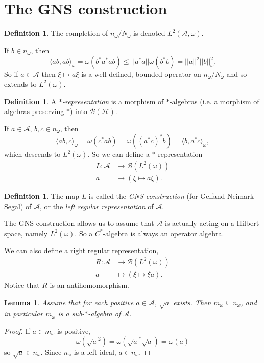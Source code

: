 \documentclass[12pt]{report}
\newcommand{\AAA}{\mathcal A}
\newcommand{\BB}{\mathcal B}
\newcommand{\HH}{\mathcal H}
\newtheorem{lemma}[theorem]{Lemma}
\theoremstyle{definition}
\newtheorem{definition}[theorem]{Definition}
\begin{document}
\section{The GNS construction}
\begin{definition}
    The completion of $n_\omega/N_\omega$ is denoted $L^2(\mathcal A, \omega)$.
\end{definition}
If $b \in n_\omega$, then
$$\langle ab, ab\rangle_\omega
    = \omega(b^*a^*ab)
    \leq ||a^*a|| \omega(b^*b) = ||a||^2 ||b||_\omega^2.$$
So if $a \in \mathcal A$ then $\xi \mapsto a\xi$ is a well-defined, bounded operator on $n_\omega/N_\omega$ and so extends to $L^2(\omega)$. 

\begin{definition}
    A \emph{$*$-representation} is a morphism of $*$-algebras (i.e. a morphism of algebras preserving $*$) into $\BB(\HH)$.
\end{definition}
If $a \in \AAA$, $b,c \in n_\omega$, then
$$\langle ab, c\rangle_\omega = \omega(c^*ab) = \omega((a^*c)^*b) = \langle b, a^*c\rangle_\omega,$$
which descends to $L^2(\omega)$. So we can define a $*$-representation
\begin{align*}
    L: \AAA &\to \BB(L^2(\omega))\\
        a &\mapsto (\xi \mapsto a\xi).
\end{align*}
\begin{definition}
    The map $L$ is called the \emph{GNS construction} (for Gelfand-Neimark-Segal) of $\AAA$, or the \emph{left regular representation} of $\AAA$.
\end{definition}
The GNS construction allows us to assume that $\AAA$ is actually acting on a Hilbert space, namely $L^2(\omega)$. So a $C^*$-algebra is always an operator algebra.

We can also define a right regular representation,
\begin{align*}
    R: \AAA &\to \BB(L^2(\omega))\\
        a &\mapsto (\xi \mapsto \xi a).
\end{align*}
Notice that $R$ is an antihomomorphism.

\begin{lemma}
    Assume that for each positive $a \in \AAA$, $\sqrt a$ exists. Then $m_\omega \subseteq n_\omega$, and in particular $m_\omega$ is a sub-$*$-algebra of $\AAA$.
    \end{lemma}
\begin{proof}
If $a \in m_\omega$ is positive, 
    $$\omega(\sqrt a^2) = \omega(\sqrt a^* \sqrt a) = \omega(a)$$
so $\sqrt a \in n_\omega$. Since $n_\omega$ is a left ideal, $a \in n_\omega$.
\end{proof}
\end{document}
